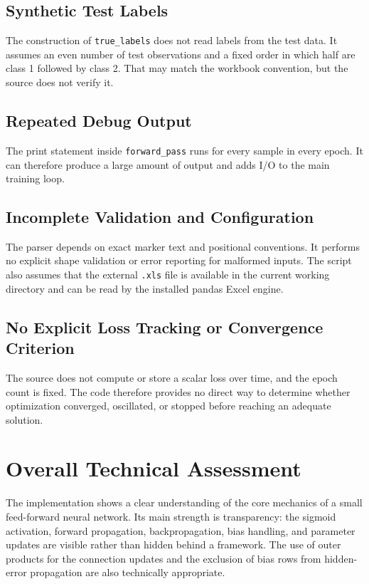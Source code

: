 \documentclass[11pt,a4paper]{article}
\newcommand{\code}[1]{\texttt{\small #1}}
\begin{document}
\subsection{Synthetic Test Labels}
The construction of \code{true\_labels} does not read labels from the test data. It assumes an even number of test observations and a fixed order in which half are class 1 followed by class 2. That may match the workbook convention, but the source does not verify it.

\subsection{Repeated Debug Output}
The print statement inside \code{forward\_pass} runs for every sample in every epoch. It can therefore produce a large amount of output and adds I/O to the main training loop.

\subsection{Incomplete Validation and Configuration}
The parser depends on exact marker text and positional conventions. It performs no explicit shape validation or error reporting for malformed inputs. The script also assumes that the external \code{.xls} file is available in the current working directory and can be read by the installed pandas Excel engine.

\subsection{No Explicit Loss Tracking or Convergence Criterion}
The source does not compute or store a scalar loss over time, and the epoch count is fixed. The code therefore provides no direct way to determine whether optimization converged, oscillated, or stopped before reaching an adequate solution.

\section{Overall Technical Assessment}
The implementation shows a clear understanding of the core mechanics of a small feed-forward neural network. Its main strength is transparency: the sigmoid activation, forward propagation, backpropagation, bias handling, and parameter updates are visible rather than hidden behind a framework. The use of outer products for the connection updates and the exclusion of bias rows from hidden-error propagation are also technically appropriate.
\end{document}
